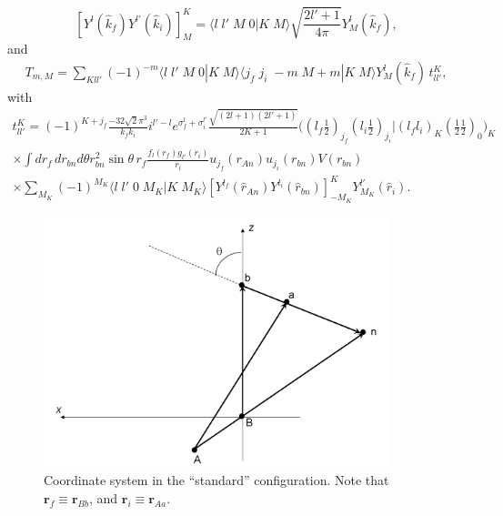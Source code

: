 	
\begin{equation}\label{eq_onept26}
\left[ Y^{l} (\hat k_f) Y^{l'} (\hat k_i)\right]^K_{M}=\langle l\;l'\;M\;0|K\;M\rangle\sqrt{\frac{2l'+1}{4\pi}}Y_{M}^{l}(\hat k_f),
\end{equation}
and
\begin{equation}\label{eq_onept27}
\begin{split}
T_{m,M}=\sum_{Kll'}(-1)^{-m}\langle l\;l'\;M\;0|K\;M\rangle \langle j_f\;j_i\;-m\;M+m|K\;M\rangle Y_{M}^{l}(\hat k_f)\,t_{ll'}^K,
\end{split}
\end{equation}
with
\begin{multline}\label{eq_onept28}
t_{ll'}^K=(-1)^{K+j_f}\frac{-32\sqrt{2}\pi^3}{k_f k_i} i^{l'-l}e^{\sigma_f^l+\sigma_i^{l'}}\frac{\sqrt{(2l+1)(2l'+1)}}{2K+1}\bigl((l_f \tfrac{1}{2})_{j_f}(l_i \tfrac{1}{2})_{j_i}|(l_f l_i)_K(\tfrac{1}{2} \tfrac{1}{2})_0\bigr)_K\\
\times\int dr_f\,dr_{bn}d\theta r_{bn}^2 \sin \theta \,r_f \frac{f_l(r_f)g_{l'}(r_i)}{r_i}u_{j_f}(r_{An})u_{j_i}(r_{bn})V(r_{bn})\\
\times\sum_{M_K}(-1)^{M_K}\langle l\;l'\;0\;M_K|K\;M_K\rangle \left[ Y^{l_f}(\hat r_{An}) Y^{l_i}(\hat r_{bn})\right]^K_{-M_K}Y_{M_K}^{l'}(\hat r_i).
\end{multline}
 \begin{figure}
\centerline{\includegraphics*[width=10cm,angle=0]{C6/figs_C6/coord.png}}
\caption{Coordinate system in the ``standard'' configuration. Note that $\mathbf{r}_f\equiv\mathbf{r}_{Bb}$, and $\mathbf{r}_i\equiv\mathbf{r}_{Aa}$.}\label{fig1}
\end{figure}
